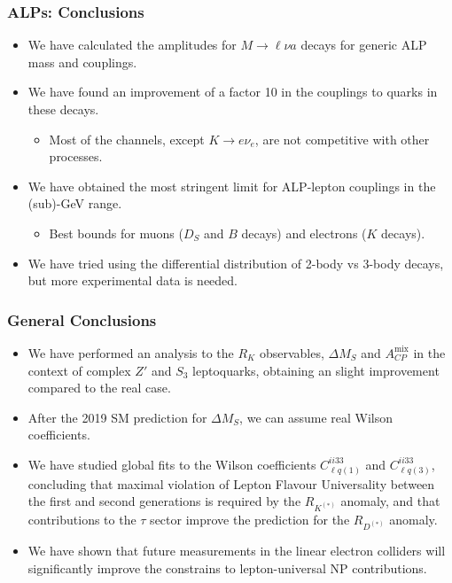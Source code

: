 \documentclass[mathserif, 10pt]{beamer}
\begin{document}
\begin{frame}\frametitle{ALPs: Conclusions}
    \begin{itemize}
        \item We have calculated the amplitudes for $M\to \ell \nu a$ decays for generic ALP mass and couplings.
        \item We have found an improvement of a factor 10 in the couplings to quarks in these decays.
              \begin{itemize}
                  \item Most of the channels, except $K\to e\nu_e$, are not competitive with other processes.
              \end{itemize}
        \item We have obtained the most stringent limit for ALP-lepton couplings in the (sub)-GeV range.
              \begin{itemize}
                  \item Best bounds for muons ($D_S$ and $B$ decays) and electrons ($K$ decays).
              \end{itemize}
        \item We have tried using the differential distribution of 2-body vs 3-body decays, but more experimental data is needed.
    \end{itemize}
\end{frame}

\begin{frame}\frametitle{General Conclusions}
    \begin{itemize}
        \item We have performed an analysis to the $R_K$ observables, $\Delta M_S$ and $A_{CP}^\mathrm{mix}$ in the context of complex $Z'$ and $S_3$ leptoquarks, obtaining an slight improvement compared to the real case.
        \item After the 2019 SM prediction for $\Delta M_S$, we can assume real Wilson coefficients.
        \item We have studied global fits to the Wilson coefficients $C_{\ell q(1)}^{ii33}$ and $C_{\ell q(3)}^{ii33}$, concluding that maximal violation of Lepton Flavour Universality between the first and second generations is required by the $R_{K^{(*)}}$ anomaly, and that contributions to the $\tau$ sector improve the prediction for the $R_{D^{(*)}}$ anomaly.
        \item We have shown that future measurements in the linear electron colliders will significantly improve the constrains to lepton-universal NP contributions.
    \end{itemize}

\end{frame}
\end{document}
